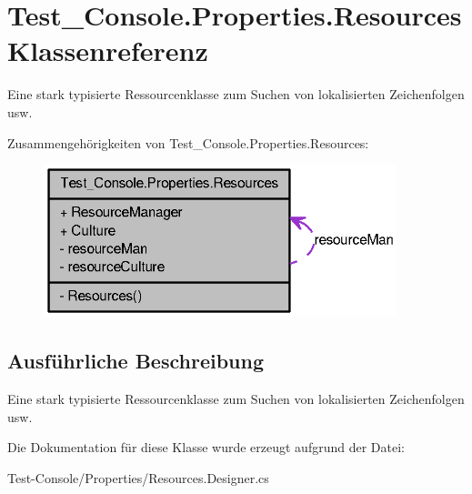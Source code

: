 \hypertarget{class_test___console_1_1_properties_1_1_resources}{
\section{Test\_\-Console.Properties.Resources Klassenreferenz}
\label{class_test___console_1_1_properties_1_1_resources}
}


Eine stark typisierte Ressourcenklasse zum Suchen von lokalisierten Zeichenfolgen usw.  




Zusammengehörigkeiten von Test\_\-Console.Properties.Resources:\nopagebreak
\begin{figure}[H]
\begin{center}
\leavevmode
\includegraphics[width=291pt]{class_test___console_1_1_properties_1_1_resources__coll__graph}
\end{center}
\end{figure}


\subsection{Ausführliche Beschreibung}
Eine stark typisierte Ressourcenklasse zum Suchen von lokalisierten Zeichenfolgen usw. 

Die Dokumentation für diese Klasse wurde erzeugt aufgrund der Datei:\begin{DoxyCompactItemize}
\item 
Test-\/Console/Properties/Resources.Designer.cs\end{DoxyCompactItemize}
